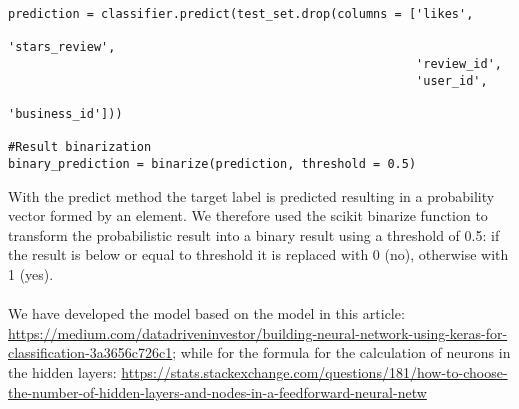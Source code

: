 \begin{lstlisting}
prediction = classifier.predict(test_set.drop(columns = ['likes', 
                                                         'stars_review', 
                                                         'review_id', 
                                                         'user_id', 
                                                         'business_id']))

#Result binarization
binary_prediction = binarize(prediction, threshold = 0.5)
\end{lstlisting}
With the predict method the target label is predicted resulting in a probability vector formed by an element. We therefore used the scikit binarize function to transform the probabilistic result into a binary result using a threshold of 0.5: if the result is below or equal to threshold it is replaced with 0 (no), otherwise with 1 (yes).\\
\\
We have developed the model based on the model in this article: \url{https://medium.com/datadriveninvestor/building-neural-network-using-keras-for-classification-3a3656c726c1}; while for the formula for the calculation of neurons in the hidden layers: \sloppy \url{https://stats.stackexchange.com/questions/181/how-to-choose-the-number-of-hidden-layers-and-nodes-in-a-feedforward-neural-netw} \fussy
